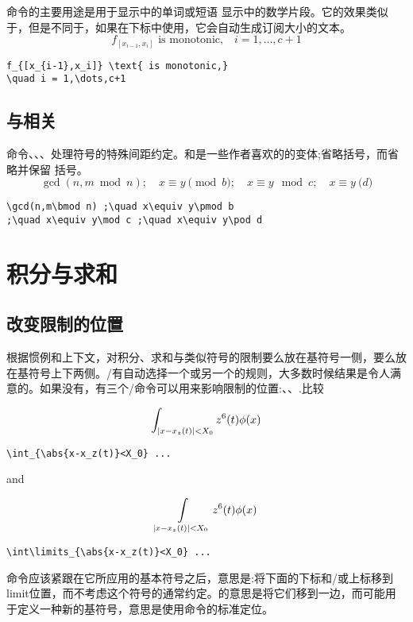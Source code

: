 命令的主要用途是用于显示中的单词或短语 显示中的数学片段。它的效果类似于，但是不同于，如果在下标中使用，它会自动生成订阅大小的文本。
\begin{equation}
f_{[x_{i-1},x_i]} \text{ is monotonic,}
\quad i = 1,\dots,c+1
\end{equation}
\begin{verbatim}
f_{[x_{i-1},x_i]} \text{ is monotonic,}
\quad i = 1,\dots,c+1
\end{verbatim}

\subsection{与相关}

命令、、、处理符号的特殊间距约定。和是一些作者喜欢的的变体;省略括号，而省略并保留
括号。
\begin{equation}
\gcd(n,m\bmod n) ;\quad x\equiv y\pmod b
;\quad x\equiv y\mod c ;\quad x\equiv y\pod d
\end{equation}
\begin{verbatim}
\gcd(n,m\bmod n) ;\quad x\equiv y\pmod b
;\quad x\equiv y\mod c ;\quad x\equiv y\pod d
\end{verbatim}


\section{积分与求和}

\subsection{改变限制的位置}

根据惯例和上下文，对积分、求和与类似符号的限制要么放在基符号一侧，要么放在基符号上下两侧。\lat/有自动选择一个或另一个的规则，大多数时候结果是令人满意的。如果没有，有三个\lat/命令可以用来影响限制的位置:、、.比较
\begin{center}
\begin{minipage}{.4\columnwidth}
\[\int_{\lvert x-x_z(t)\rvert<X_0} z^6(t)\phi(x)\]
\begin{verbatim}
\int_{\abs{x-x_z(t)}<X_0} ...
\end{verbatim}
\end{minipage}\quad
and\quad
\begin{minipage}{.5\columnwidth}
\[\int\limits_{\lvert x-x_z(t)\rvert<X_0} z^6(t)\phi(x)\]
\begin{verbatim}
\int\limits_{\abs{x-x_z(t)}<X_0} ...
\end{verbatim}
\end{minipage}
\end{center}
命令应该紧跟在它所应用的基本符号之后，意思是:将下面的下标和/或上标移到limit位置，而不考虑这个符号的通常约定。的意思是将它们移到一边，而可能用于定义一种新的基符号，意思是使用命令的标准定位。

